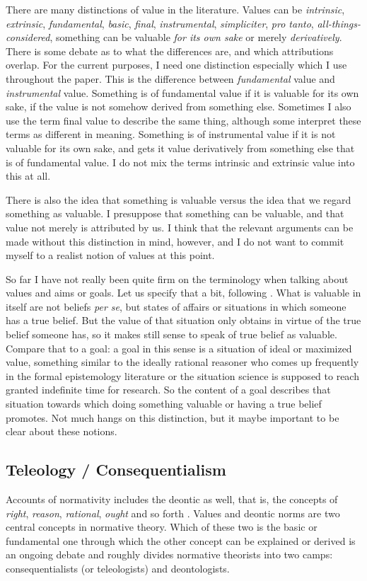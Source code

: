 \documentclass[12pt,numbers=noenddot]{scrartcl}
\begin{document}
There are many distinctions of value in the literature. Values can be \emph{intrinsic}, \emph{extrinsic}, \emph{fundamental}, \emph{basic}, \emph{final}, \emph{instrumental}, \emph{simpliciter}, \emph{pro tanto}, \emph{all-things-considered}, something can be valuable \emph{for its own sake} or merely \emph{derivatively}. There is some debate as to what the differences are, and which attributions overlap. For the current purposes, I need one distinction especially which I use throughout the paper. This is the difference between \emph{fundamental} value and \emph{instrumental} value. Something is of fundamental value if it is valuable for its own sake, if the value is not somehow derived from something else. Sometimes I also use the term final value to describe the same thing, although some interpret these terms as different in meaning. Something is of instrumental value if it is not valuable for its own sake, and gets it value derivatively from something else that is of fundamental value. I do not mix the terms intrinsic and extrinsic value into this at all.

There is also the idea that something is valuable versus the idea that we regard something as valuable. I presuppose that something can be valuable, and that value not merely is attributed by us. I think that the relevant arguments can be made without this distinction in mind, however, and I do not want to commit myself to a realist notion of values at this point.

So far I have not really been quite firm on the terminology when talking about values and aims or goals. Let us specify that a bit, following \textcite[344f.]{Berker2013-BERETA-2}. What is valuable in itself are not beliefs \emph{per se}, but states of affairs or situations in which someone has a true belief. But the value of that situation only obtains in virtue of the true belief someone has, so it makes still sense to speak of true belief as valuable. Compare that to a goal: a goal in this sense is a situation of ideal or maximized value, something similar to the ideally rational reasoner who comes up frequently in the formal epistemology literature or the situation science is supposed to reach granted indefinite time for research. So the content of a goal describes that situation towards which doing something valuable or having a true belief promotes. Not much hangs on this distinction, but it maybe important to be clear about these notions.

\subsection{ Teleology / Consequentialism} \label{subsec: teleology}
 Accounts of normativity includes the deontic as well, that is, the concepts of \emph{right}, \emph{reason}, \emph{rational}, \emph{ought} and so forth \autocite[21]{sep-value-theory}. Values and deontic norms are two central concepts in normative theory. Which of these two is the basic or fundamental one through which the other concept can be explained or derived is an ongoing debate and roughly divides normative theorists into two camps: consequentialists (or teleologists) and deontologists. 
\end{document}
